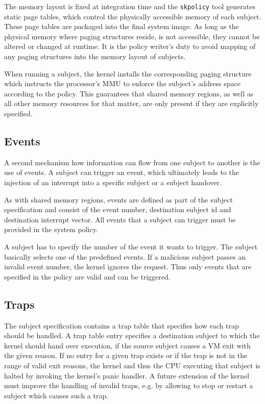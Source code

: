 The memory layout is fixed at integration time and the \texttt{skpolicy} tool
generates static page tables, which control the physically accessible memory of
each subject. These page tables are packaged into the final system image. As
long as the physical memory where paging structures reside, is not accessible,
they cannot be altered or changed at runtime. It is the policy writer's duty to
avoid mapping of any paging structures into the memory layout of subjects.

When running a subject, the kernel installs the corresponding paging structure
which instructs the processor's MMU to enforce the subject's address space
according to the policy. This guarantees that shared memory regions, as well as
all other memory resources for that matter, are only present if they are
explicitly specified.

\subsection{Events}
A second mechanism how information can flow from one subject to another is the
use of events. A subject can trigger an event, which ultimately leads to the
injection of an interrupt into a specific subject or a subject handover.

As with shared memory regions, events are defined as part of the subject
specification and consist of the event number, destination subject id and
destination interrupt vector. All events that a subject can trigger must be
provided in the system policy.

A subject has to specify the number of the event it wants to trigger. The
subject basically selects one of the predefined events. If a malicious subject
passes an invalid event number, the kernel ignores the request. Thus only events
that are specified in the policy are valid and can be triggered.

\subsection{Traps}
The subject specification contains a trap table that specifies how each trap
should be handled. A trap table entry specifies a destination subject to which
the kernel should hand over execution, if the source subject causes a VM exit
with the given reason. If no entry for a given trap exists or if the trap is not
in the range of valid exit reasons, the kernel and thus the CPU executing that
subject is halted by invoking the kernel's panic handler. A future extension of
the kernel must improve the handling of invalid traps, e.g. by allowing to
stop or restart a subject which causes such a trap.

